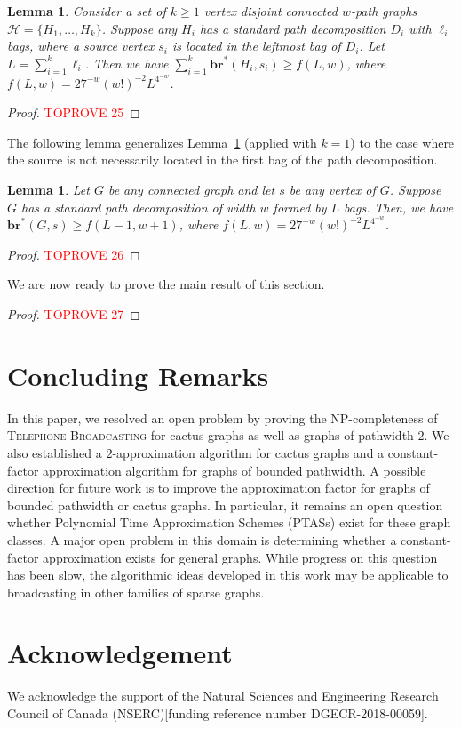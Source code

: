 \documentclass[letterpaper,11pt]{article}
\newtheorem{lemma}[theorem]{Lemma}
\newcommand{\bropt}{{\boldsymbol{br}^*}}
\newcommand{\bigell}{L}
\newcommand{\telebr}{\textsc{Telephone Broadcasting}\xspace}
\newcommand{\pwidth}{w}
\begin{document}
\begin{lemma} \label{lemma:brlbsonleft}
    Consider a set of $k\geq 1$ vertex disjoint connected $\pwidth$-path graphs $\mathcal{H} = \{H_1, \ldots, H_k\}$. Suppose any $H_i$ has a standard path decomposition $D_i$ with $\ell_i$ bags, where a source vertex $s_i$ is located in the leftmost bag of $D_i$. Let $\bigell = \sum_{i=1}^k \ell_i$. 
    Then we have
    $\sum_{i=1}^k \bropt(H_i, s_i) \geq f(\bigell, \pwidth)$, where $f(\bigell, \pwidth) = 27^{-\pwidth}(\pwidth!)^{-2}\bigell^{4^{-\pwidth}}$.
\end{lemma}

\begin{proof}\textcolor{red}{TOPROVE 25}\end{proof}


The following lemma generalizes Lemma~\ref{lemma:brlbsonleft} (applied with $k=1$) to the case where the source is not necessarily located in the first bag of the path decomposition.

\begin{lemma}
\label{lemma:pwidth-ell}
   Let $G$ be any connected graph 
   and 
   let $s$ be any vertex of $G$. Suppose $G$ has a standard path decomposition of width $\pwidth$ formed by $\bigell$ bags. Then, we have $\bropt(G,s) \geq f(\bigell-1,\pwidth+1)$, where $f(\bigell, \pwidth) = 27^{-\pwidth}(\pwidth!)^{-2}\bigell^{4^{-\pwidth}}$.
\end{lemma}
\begin{proof}\textcolor{red}{TOPROVE 26}\end{proof}

We are now ready to prove the main result of this section.

\begin{proof}\textcolor{red}{TOPROVE 27}\end{proof}
 \section{Concluding Remarks}\label{section:concluding}

In this paper, we resolved an open problem by proving the NP-completeness of \telebr for cactus graphs as well as graphs of pathwidth $2$. We also established a $2$-approximation algorithm for cactus graphs and a constant-factor approximation algorithm for graphs of bounded pathwidth. A possible direction for future work is to improve the approximation factor for graphs of bounded pathwidth or cactus graphs. In particular, it remains an open question whether Polynomial Time Approximation Schemes (PTASs) exist for these graph classes. A major open problem in this domain is determining whether a constant-factor approximation exists for general graphs. While progress on this question has been slow, the algorithmic ideas developed in this work may be applicable to broadcasting in other families of sparse graphs.

\section*{Acknowledgement}
We acknowledge the support of the Natural Sciences and Engineering Research Council of Canada (NSERC)[funding reference number DGECR-2018-00059]. 



\end{document}
